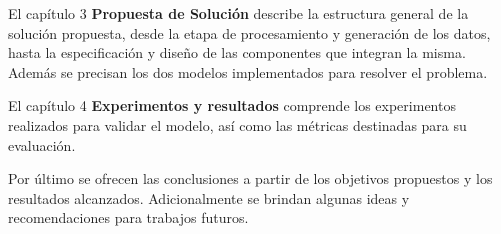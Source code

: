 El capítulo 3 \textbf{Propuesta de Solución} describe la estructura general de la solución propuesta, desde la etapa de procesamiento y generación de los datos, hasta la especificación y diseño de las componentes que integran la misma. Además se precisan los dos modelos implementados para resolver el problema.

El capítulo 4 \textbf{Experimentos y resultados} comprende los experimentos realizados para validar el modelo, así como las métricas destinadas para su evaluación. 

Por último se ofrecen las conclusiones a partir de los objetivos propuestos y los resultados alcanzados. Adicionalmente se brindan algunas ideas y recomendaciones para trabajos futuros.





